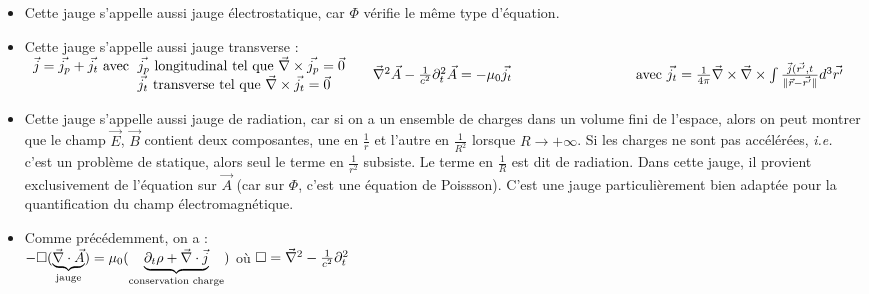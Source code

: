 	
	\begin{remarks}\hspace{1pt}
		\begin{itemize}
			\item Cette jauge s'appelle aussi jauge électrostatique, car $\Phi$ vérifie le même type d'équation.
			\item Cette jauge s'appelle aussi jauge transverse :\\
			\indent $\begin{array}{r@{\;}l}
					\vec{j}=\vec{j_p}+\vec{j_t} \text{ avec }&\vec{j_p} \text{ longitudinal tel que } \nab\times\vec{j_p}=\vec{0}\\
					&\vec{j_t} \text{ transverse tel que } \nab\times\vec{j_t}=\vec{0}
			\end{array}\\[10pt]\indent
			\nab^2\vec{A}-\frac{1}{c^2}\partial_t^2\vec{A}=-\mu_0\vec{j_t}\\
			\text{\hspace{3cm} avec }\vec{j_t}=\frac{1}{4\pi}\nab\times\nab\times\int\frac{\vec{j}(\vec{r'},t}{\parallel\vec{r}-\vec{r'}\parallel}d^3\vec{r'}
			$
			\item Cette jauge s'appelle aussi jauge de radiation, car si on a un ensemble de charges dans un volume fini de l'espace, alors on peut montrer que le champ $\vec{E}$, $\vec{B}$ contient deux composantes, une en $\frac{1}{r}$ et l'autre en $\frac{1}{R^2}$ lorsque $R\rightarrow+\infty$. Si les charges ne sont pas accélérées, \emph{i.e.} c'est un problème de statique, alors seul le terme en $\frac{1}{r^2}$ subsiste. Le terme en $\frac{1}{R}$ est dit de radiation. Dans cette jauge, il provient exclusivement de l'équation sur $\vec{A}$ (car sur $\Phi$, c'est une équation de Poissson). C'est une jauge particulièrement bien adaptée pour la quantification du champ électromagnétique.
			\item Comme précédemment, on a :\\
					 $-\square(\underbrace{\vec{\nabla}\cdot\vec{A}}_{\text{jauge}})=\mu_0(\underbrace{\partial_t\rho+\vec{\nabla}\cdot\vec{j}}_{\text{conservation  charge}})$
			\hspace{1cm} où
			 $\square=\vec{\nabla}^2-\frac{1}{c^2}\partial_t^2$
		\end{itemize}
	\end{remarks}